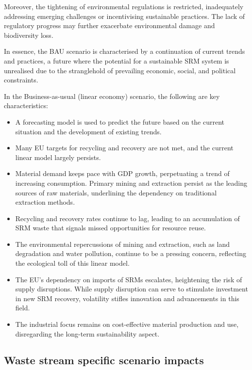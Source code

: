 Moreover, the tightening of environmental regulations is restricted, inadequately addressing emerging challenges or incentivising sustainable practices. The lack of regulatory progress may further exacerbate environmental damage and biodiversity loss.

In essence, the BAU scenario is characterised by a continuation of current trends and practices, a future where the potential for a sustainable SRM system is unrealised due to the stranglehold of prevailing economic, social, and political constraints.

In the Business-as-usual (linear economy) scenario, the following are key characteristics:

\begin{itemize}
  \item A forecasting model is used to predict the future based on the current situation and the development of existing trends.
  \item Many EU targets for recycling and recovery are not met, and the current linear model largely persists.
  \item Material demand keeps pace with GDP growth, perpetuating a trend of increasing consumption. Primary mining and extraction persist as the leading sources of raw materials, underlining the dependency on traditional extraction methods.
  \item Recycling and recovery rates continue to lag, leading to an accumulation of SRM waste that signals missed opportunities for resource reuse.
  \item The environmental repercussions of mining and extraction, such as land degradation and water pollution, continue to be a pressing concern, reflecting the ecological toll of this linear model.
  \item The EU's dependency on imports of SRMs escalates, heightening the risk of supply disruptions. While supply disruption can serve to stimulate investment in new SRM recovery, volatility stifles innovation and advancements in this field.
  \item The industrial focus remains on cost-effective material production and use, disregarding the long-term sustainability aspect.
\end{itemize}

\subsectionEndline
\clearpage

\subsection{Waste stream specific scenario impacts}

